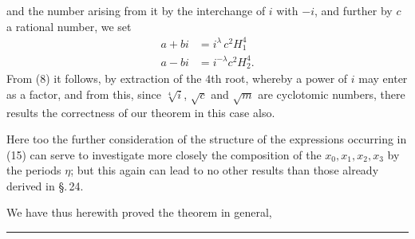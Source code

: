 and the number arising from it by the interchange of $i$ with $-i$,
and further by $c$ a rational number, we set
\[
\begin{aligned}
a + b i &= i^{\lambda}\, c^2 H_1^4\\
a - b i &= i^{-\lambda} c^2 H_2^4.
\end{aligned}
\]
From (8) it follows, by extraction of the $4$th root, whereby
a power of $i$ may enter as a factor,
and from this, since $\sqrt[4]{i}$, $\sqrt{c}$ and $\sqrt{m}$ are cyclotomic
numbers, there results the correctness of our theorem in this case also.

Here too the further consideration of the structure of the expressions
occurring in (15) can serve to investigate more closely the composition
of the $x_0, x_1, x_2, x_3$ by the periods $\eta$; but this again can
lead to no other results than those already derived in \S.\,24.

We have thus herewith proved the theorem in general, 

\rule{3cm}{0.4pt}
